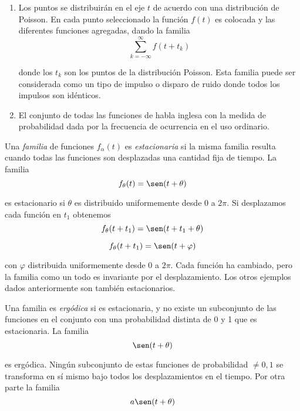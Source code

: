 \begin{enumerate}
  \item Los puntos se distribuir\'an en el eje $t$ de acuerdo con una
  distribuci\'on de Poisson. En cada punto seleccionado la funci\'on $f(t)$ es
  colocada y las diferentes funciones agregadas, dando la familia
  \begin{equation}
    \sum_{k=-\infty}^{\infty} f(t+t_k)
  \end{equation}

  donde los $t_k$ son los puntos de la distribuci\'on Poisson. Esta familia
  puede ser considerada como un tipo de impulso o disparo de ruido donde todos
  los impulsos son id\'enticos.

  \item El conjunto de todas las funciones de habla inglesa con la medida de
  probabilidad dada por la frecuencia de ocurrencia en el uso ordinario.
\end{enumerate}

Una {\em familia} de funciones $f_{\alpha}(t)$ es {\em estacionaria} si la misma
familia resulta cuando todas las funciones son desplazadas una cantidad fija de
tiempo. La familia
\begin{equation}
  f_{\theta}(t) = \sen(t+\theta)
\end{equation}

es estacionario si $\theta$ es distribuido uniformemente desde 0 a $2\pi$. Si
desplazamos cada funci\'on en $t_1$ obtenemos
\begin{equation}
  f_{\theta}(t+t_1) = \sen(t+t_1+\theta)
\end{equation}

\begin{equation}
  f_{\theta}(t+t_1) = \sen(t+\varphi)
\end{equation}

con $\varphi$ distribuida uniformemente desde 0 a $2\pi$. Cada funci\'on ha
cambiado, pero la familia como un todo es invariante por el desplazamiento.
Los otros ejemplos dados anteriormente son tambi\'en estacionarios.

Una familia es {\em erg\'odica} si es estacionaria, y no existe un subconjunto
de las funciones en el conjunto con una probabilidad distinta de 0 y 1 que es
estacionaria. La familia
\begin{equation}
  \sen(t+\theta)
\end{equation}

es erg\'odica. Ning\'un subconjunto de estas funciones de probabilidad
$\neq0,1$ se transforma en s\'i mismo bajo todos los desplazamientos en el
tiempo. Por otra parte la familia
\begin{equation}
  a \sen(t+\theta)
\end{equation}

